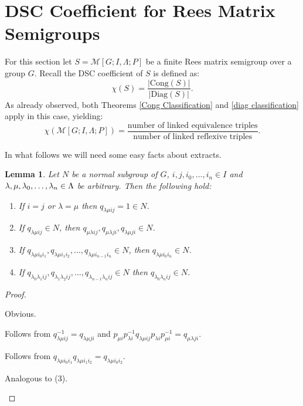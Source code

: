 \documentclass[a4paper, 12pt,reqno]{amsart}
\theoremstyle{plain}
\newtheorem{lemma}[thm]{Lemma}
\theoremstyle{definition}
\theoremstyle{remark}
\newcommand{\RM}{\mathcal{M}[G;I,\Lambda;P]}
\newcommand{\Cong}{\text{Cong}}
\newcommand{\Diag}{\text{Diag}}
\begin{document}
\section{DSC Coefficient for Rees Matrix Semigroups}

For this section let $S = \RM$ be a finite Rees matrix semigroup over a group $G$.
Recall the DSC coefficient of $S$ is defined as:
\begin{equation*}
    \chi(S) = \frac{|\Cong(S)|}{|\Diag(S)|}.
\end{equation*}
As already observed, both Theorems \ref{Cong Classification} and \ref{diag classification} apply in this case, yielding:
\begin{equation}
    \label{form of dsc coeff for RM}
    \chi(\RM) = \frac{\text{number of linked equivalence triples}}{\text{number of linked reflexive triples}}.
\end{equation}

In what follows we will need some easy facts about extracts.
\begin{lemma}
    \label{Extract Facts}
    Let $N$ be a normal subgroup of $G$, $i,j,i_0,\dots,i_n \in I$ and $\lambda,\mu,\lambda_0,\dots, \\ \lambda_n \in \Lambda$ be arbitrary. Then the following hold:
    \begin{enumerate}
        \label{Extract Facts 1}
        \item If $i = j$ or $\lambda = \mu$ then $q_{\lambda \mu i j} = 1 \in N$.
        \label{Extract Facts 2}
        \item If $q_{\lambda \mu i j} \in N$, then $q_{\mu \lambda i j} , q_{\mu \lambda j i} , q_{\lambda \mu j i} \in N$.
        \label{Extract Facts 3}
        \item If $q_{\lambda \mu i_0 i_1}, q_{\lambda \mu i_1 i_2}, \dots , q_{\lambda \mu i_{n-1} i_n} \in N$, then $q_{\lambda \mu i_0 i_n} \in N$.
        \label{Extract Facts 4}
        \item If $q_{\lambda_0 \lambda_1 i j},q_{\lambda_1 \lambda_2 i j} ,\dots , q_{\lambda_{n-1} \lambda_n i j} \in N$ then $q_{\lambda_0 \lambda_n i j} \in N$.
    \end{enumerate}
\end{lemma}

\begin{proof}
    \begin{enumerate*}
        \item Obvious. 
        \item Follows from $q_{\lambda \mu i j}^{-1} = q_{\lambda \mu j i}$ and $p_{\mu i} p_{\lambda i}^{-1} q_{\lambda \mu i j} p_{\lambda i} p_{\mu i}^{-1} = q_{\mu \lambda j i}$. 
        \item Follows from $q_{\lambda \mu i_0 i_1} q_{\lambda \mu i_1 i_2}= q_{\lambda \mu i_0 i_2} $. 
        \item Analogous to (3).
    \end{enumerate*}
\end{proof}
\end{document}
